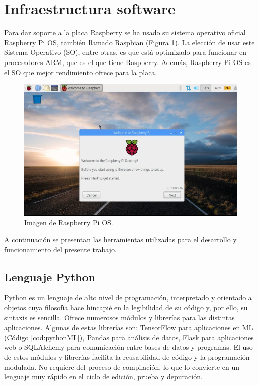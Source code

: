 \section{Infraestructura software}
Para dar soporte a la placa Raspberry se ha usado su sistema operativo oficial Raspberry Pi OS, también llamado Raspbian (Figura \ref{fig:raspbian}). La elección de usar este Sistema Operativo (SO), entre otras, es que está optimizado para funcionar en procesadores ARM, que es el que tiene Raspberry. Además, Raspberry Pi OS es el SO que mejor rendimiento ofrece para la placa.\\
\begin{figure} [h!]
  \begin{center}
    \includegraphics[width=14cm]{figs/raspbian}
  \end{center}
  \caption{Imagen de Raspberry Pi OS.}
  \label{fig:raspbian}
\end{figure}

A continuación se presentan las herramientas utilizadas para el desarrollo y funcionamiento del presente trabajo.

\subsection{Lenguaje Python}
\label{sec:python}
Python es un lenguaje de alto nivel de programación, interpretado y orientado a objetos cuya filosofía hace hincapié en la legibilidad de su código y, por ello, su sintaxis es sencilla. Ofrece numerosos módulos y librerías para las distintas aplicaciones. Algunas de estas librerías son: TensorFlow para aplicaciones en ML (Código \ref{cod:pythonML}), Pandas para análisis de datos, Flask para aplicaciones web o SQLAlchemy para comunicación entre bases de datos y programas. El uso de estos módulos y librerías facilita la reusabilidad de código y la programación modulada. No requiere del proceso de compilación, lo que lo convierte en un lenguaje muy rápido en el ciclo de edición, prueba y depuración.\\

